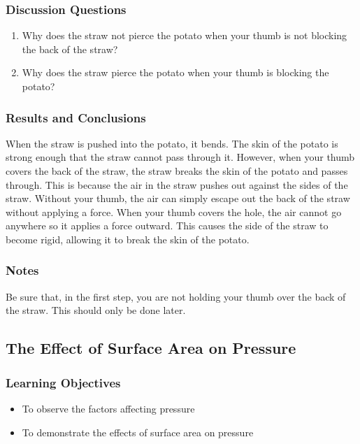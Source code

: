 \subsubsection*{Discussion Questions}
\begin{enumerate}
\item{Why does the straw not pierce the potato when your thumb is not blocking the back of the straw?}
\item{Why does the straw pierce the potato when your thumb is blocking the potato?}
\end{enumerate}

\subsubsection*{Results and Conclusions}
When the straw is pushed into the potato, it bends. The skin of the potato is strong enough that the straw cannot pass through it. However, when your thumb covers the back of the straw, the straw breaks the skin of the potato and passes through. This is because the air in the straw pushes out against the sides of the straw. Without your thumb, the air can simply escape out the back of the straw without applying a force. When your thumb covers the hole, the air cannot go anywhere so it applies a force outward. This causes the side of the straw to become rigid, allowing it to break the skin of the potato.

\subsubsection*{Notes}
Be sure that, in the first step, you are not holding your thumb over the back of the straw. This should only be done later.

\subsection{The Effect of Surface Area on Pressure}

\subsubsection*{Learning Objectives}
\begin{itemize}
\item{To observe the factors affecting pressure} 
\item{To demonstrate the effects of surface area on pressure} 
\end{itemize}


